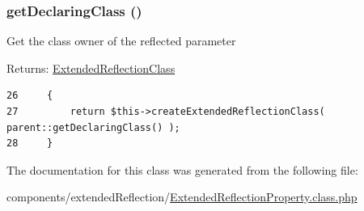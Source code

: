 \hypertarget{class_extended_reflection_property_acff3f8d93cc250281f0f73bff3422e1}{
\subsubsection[{getDeclaringClass}]{\setlength{\rightskip}{0pt plus 5cm}getDeclaringClass ()}}
\label{class_extended_reflection_property_acff3f8d93cc250281f0f73bff3422e1}


Get the class owner of the reflected parameter

\begin{Desc}
\item[Returns:]\hyperlink{class_extended_reflection_class}{ExtendedReflectionClass} \end{Desc}


\begin{Code}\begin{verbatim}26     {
27         return $this->createExtendedReflectionClass( parent::getDeclaringClass() );
28     }
\end{verbatim}
\end{Code}




The documentation for this class was generated from the following file:\begin{CompactItemize}
\item 
components/extendedReflection/\hyperlink{_extended_reflection_property_8class_8php}{ExtendedReflectionProperty.class.php}\end{CompactItemize}
